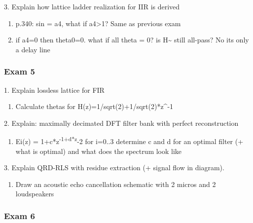 \documentclass[
  a4paper,
  ,captions=tableheading
]{scrartcl}
\providecommand{\tightlist}{%
  \setlength{\itemsep}{0pt}\setlength{\parskip}{0pt}}
\begin{document}
3. Explain how lattice ladder realization for IIR is derived

\begin{enumerate}
\def\labelenumi{\arabic{enumi}.}
\tightlist
\item
  p.340: sin = a4, what if \textbar a4\textbar\textgreater1? Same as
  previous exam\\
\item
  if a4=0 then theta0=0. what if all theta = 0? is H\textasciitilde{}
  still all-pass? No its only a delay line
\end{enumerate}

\subsubsection{Exam 5}\label{exam-5}

1. Explain lossless lattice for FIR

\begin{enumerate}
\def\labelenumi{\arabic{enumi}.}
\tightlist
\item
  Calculate thetas for H(z)=1/sqrt(2)+1/sqrt(2)*z\^{}-1
\end{enumerate}

2. Explain: maximally decimated DFT filter bank with perfect
reconstruction

\begin{enumerate}
\def\labelenumi{\arabic{enumi}.}
\tightlist
\item
  Ei(z) = 1+c*z\textsuperscript{-1+d*z}-2 for i=0..3 determine c and d
  for an optimal filter (+ what is optimal) and what does the spectrum
  look like
\end{enumerate}

3. Explain QRD-RLS with residue extraction (+ signal flow in diagram).

\begin{enumerate}
\def\labelenumi{\arabic{enumi}.}
\tightlist
\item
  Draw an acoustic echo cancellation schematic with 2 micros and 2
  loudspeakers
\end{enumerate}

\subsubsection{}\label{section-28}

\subsubsection{Exam 6}\label{exam-6}
\end{document}
